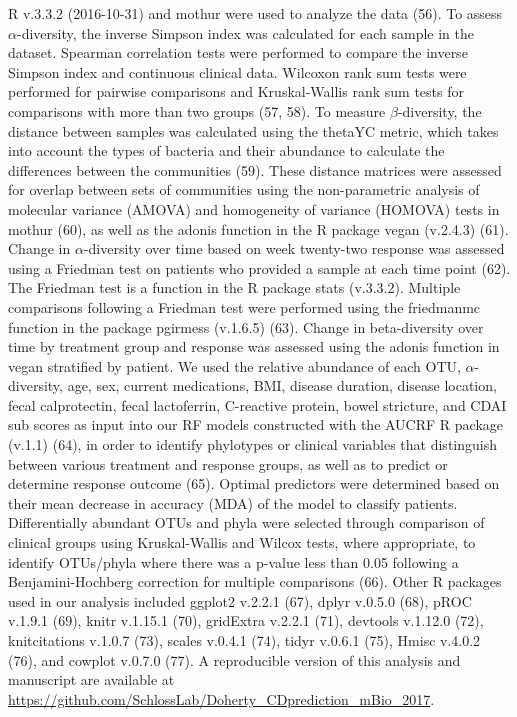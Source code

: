 \documentclass[12pt,]{article}
\begin{document}
R v.3.3.2 (2016-10-31) and mothur were used to analyze the data (56). To
assess \({\alpha}\)-diversity, the inverse Simpson index was calculated
for each sample in the dataset. Spearman correlation tests were
performed to compare the inverse Simpson index and continuous clinical
data. Wilcoxon rank sum tests were performed for pairwise comparisons
and Kruskal-Wallis rank sum tests for comparisons with more than two
groups (57, 58). To measure \({\beta}\)-diversity, the distance between
samples was calculated using the thetaYC metric, which takes into
account the types of bacteria and their abundance to calculate the
differences between the communities (59). These distance matrices were
assessed for overlap between sets of communities using the
non-parametric analysis of molecular variance (AMOVA) and homogeneity of
variance (HOMOVA) tests in mothur (60), as well as the adonis function
in the R package vegan (v.2.4.3) (61). Change in \({\alpha}\)-diversity
over time based on week twenty-two response was assessed using a
Friedman test on patients who provided a sample at each time point (62).
The Friedman test is a function in the R package stats (v.3.3.2).
Multiple comparisons following a Friedman test were performed using the
friedmanmc function in the package pgirmess (v.1.6.5) (63). Change in
beta-diversity over time by treatment group and response was assessed
using the adonis function in vegan stratified by patient. We used the
relative abundance of each OTU, \({\alpha}\)-diversity, age, sex,
current medications, BMI, disease duration, disease location, fecal
calprotectin, fecal lactoferrin, C-reactive protein, bowel stricture,
and CDAI sub scores as input into our RF models constructed with the
AUCRF R package (v.1.1) (64), in order to identify phylotypes or
clinical variables that distinguish between various treatment and
response groups, as well as to predict or determine response outcome
(65). Optimal predictors were determined based on their mean decrease in
accuracy (MDA) of the model to classify patients. Differentially
abundant OTUs and phyla were selected through comparison of clinical
groups using Kruskal-Wallis and Wilcox tests, where appropriate, to
identify OTUs/phyla where there was a p-value less than 0.05 following a
Benjamini-Hochberg correction for multiple comparisons (66). Other R
packages used in our analysis included ggplot2 v.2.2.1 (67), dplyr
v.0.5.0 (68), pROC v.1.9.1 (69), knitr v.1.15.1 (70), gridExtra v.2.2.1
(71), devtools v.1.12.0 (72), knitcitations v.1.0.7 (73), scales v.0.4.1
(74), tidyr v.0.6.1 (75), Hmisc v.4.0.2 (76), and cowplot v.0.7.0 (77).
A reproducible version of this analysis and manuscript are available at
\url{https://github.com/SchlossLab/Doherty_CDprediction_mBio_2017}.
\end{document}
